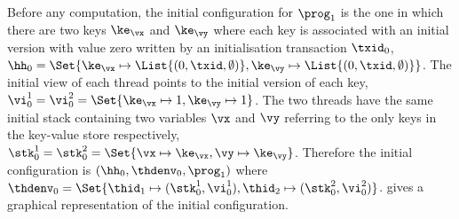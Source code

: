 Before any computation, the initial configuration for $\prog_1$ is the one in which there are two keys \( \ke_{\vx}\) and \( \ke_{\vy} \) where each key is associated with an initial version with value zero written by an initialisation transaction $\txid_0$, \( \hh_{0} = \Set{\ke_{\vx} \mapsto \List{(0, \txid, \emptyset)}, \ke_{\vy} \mapsto \List{(0, \txid, \emptyset)}} \).
The initial view of each thread points to the initial version of each key, \( \vi^{1}_{0} = \vi^{2}_{0} = \Set{\ke_{\vx} \mapsto 1, \ke_{\vy} \mapsto 1}\).
The two threads have the same initial stack containing two variables \( \vx \) and \( \vy \) referring to the only keys in the key-value store respectively, \ie \( \stk^{1}_{0} = \stk^{2}_{0} = \Set{\vx \mapsto \ke_{\vx}, \vy \mapsto \ke_{\vy}}\).
Therefore the initial configuration is \( (\hh_{0}, \thdenv_{0}, \prog_{1}) \) where \( \thdenv_{0} = \Set{\thid_{1} \mapsto (\stk_{0}^{1}, \vi_{0}^{1}), \thid_{2} \mapsto (\stk_{0}^{2}, \vi_{0}^{2})}\).
 gives a graphical representation of the initial configuration.
 



